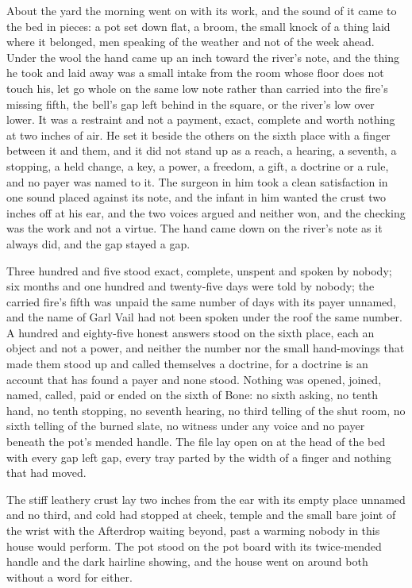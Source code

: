 About the yard the morning went on with its work, and the sound of it came to the bed in pieces: a pot set down flat, a broom, the small knock of a thing laid where it belonged, men speaking of the weather and not of the week ahead. Under the wool the hand came up an inch toward the river's note, and the thing he took and laid away was a small intake from the room whose floor does not touch his, let go whole on the same low note rather than carried into the fire's missing fifth, the bell's gap left behind in the square, or the river's low over lower. It was a restraint and not a payment, exact, complete and worth nothing at two inches of air. He set it beside the others on the sixth place with a finger between it and them, and it did not stand up as a reach, a hearing, a seventh, a stopping, a held change, a key, a power, a freedom, a gift, a doctrine or a rule, and no payer was named to it. The surgeon in him took a clean satisfaction in one sound placed against its note, and the infant in him wanted the crust two inches off at his ear, and the two voices argued and neither won, and the checking was the work and not a virtue. The hand came down on the river's note as it always did, and the gap stayed a gap.

Three hundred and five stood exact, complete, unspent and spoken by nobody; six months and one hundred and twenty-five days were told by nobody; the carried fire's fifth was unpaid the same number of days with its payer unnamed, and the name of Garl Vail had not been spoken under the roof the same number. A hundred and eighty-five honest answers stood on the sixth place, each an object and not a power, and neither the number nor the small hand-movings that made them stood up and called themselves a doctrine, for a doctrine is an account that has found a payer and none stood. Nothing was opened, joined, named, called, paid or ended on the sixth of Bone: no sixth asking, no tenth hand, no tenth stopping, no seventh hearing, no third telling of the shut room, no sixth telling of the burned slate, no witness under any voice and no payer beneath the pot's mended handle. The file lay open on  at the head of the bed with every gap left gap, every tray parted by the width of a finger and nothing that had moved.

The stiff leathery crust lay two inches from the ear with its empty place unnamed and no third, and cold had stopped at cheek, temple and the small bare joint of the wrist with the Afterdrop waiting beyond, past a warming nobody in this house would perform. The pot stood on the pot board with its twice-mended handle and the dark hairline showing, and the house went on around both without a word for either.
